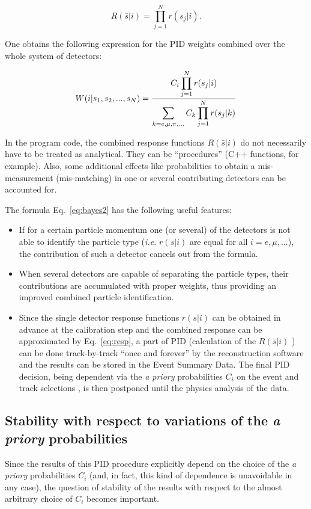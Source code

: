 \documentclass[12pt,a4paper,twoside]{article}
\begin{document}
{\begin{equation}\label{eq:resp}
  R(\bar{s}|i)=\prod_{j=1}^{N}r(s_j|i).
\end{equation}

One obtains the following expression for the PID weights combined over the
whole system of detectors:

\begin{equation}\label{eq:bayes2}
  W(i|s_1, s_2, ..., s_N)={\displaystyle C_i \prod_{j=1}^{N}r(s_j|i) \over 
\displaystyle \sum_{k=e, \mu, \pi, ...}C_k \prod_{j=1}^{N}r(s_j|k)} 
\end{equation}


In the program code, the combined response functions $R(\bar{s}|i)$
do not necessarily have to be treated as analytical. They can be ``procedures''
(C++ functions, for example).  Also, some additional effects like 
probabilities to obtain a mis-measurement (mis-matching) in one or several
contributing detectors can be accounted for.

The formula Eq.~\ref{eq:bayes2} has the following useful features:
\begin{itemize}
\item If for a certain particle momentum one (or several) of the detectors 
  is not able to identify the particle type ({\it i.e.} $r(s|i)$ are equal 
  for all $i=e, \mu, ...$), the contribution of such a detector cancels out 
  from the formula.
\item When several detectors are capable of separating the particle types, 
their  contributions are accumulated with proper weights, thus providing 
an improved  combined particle identification.
\item Since the single detector response functions $r(s|i)$ can be obtained
  in advance at the calibration step and the combined response 
  can be approximated by Eq.~\ref{eq:resp}, a part of PID (calculation of
  the $R(\bar{s}|i)$ ) can be done track-by-track
  ``once and forever'' by the reconstruction software and the results
  can be stored in the Event Summary Data.  The final PID decision,
  being dependent  via the {\it a priory} probabilities $C_i$ on the event 
  and track selections , is then postponed until the physics analysis of the 
  data. 
\end{itemize}

\subsection{Stability with respect to variations of the {\it a priory} probabilities}
Since the results of this PID procedure explicitly depend on the choice
of the {\it a priory} probabilities $C_i$ (and, in fact, this kind of 
dependence is unavoidable in any case), the question of stability of the
results with respect to the almost arbitrary choice of $C_i$ becomes important.

}
\end{document}
